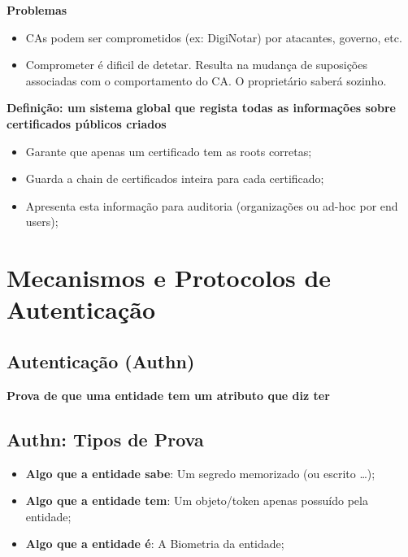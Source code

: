 \documentclass{article}
\begin{document}
\begin{flushleft}
  \textbf{Problemas}
  \begin{itemize}
    \item CAs podem ser comprometidos (ex: DigiNotar) por atacantes,
    governo, etc.
    \item Comprometer é dificil de detetar. Resulta na mudança de
    suposições associadas com o comportamento do CA.
    O proprietário saberá sozinho.
  \end{itemize}

  \vspace{2mm}

  \textbf{Definição: um sistema global que regista todas as informações sobre
  certificados públicos criados}
  \begin{itemize}
    \item Garante que apenas um certificado tem as roots corretas;
    \item Guarda a chain de certificados inteira para cada certificado;
    \item Apresenta esta informação para auditoria (organizações
    ou ad-hoc por end users);
  \end{itemize}
\end{flushleft}

\pagebreak

\section{Mecanismos e Protocolos de Autenticação}

\subsection{Autenticação (Authn)}

\textbf{Prova de que uma entidade tem um atributo que diz ter}

\subsection{Authn: Tipos de Prova}

\begin{itemize}
  \item \textbf{Algo que a entidade sabe}: Um segredo memorizado (ou escrito \dots);
  \item \textbf{Algo que a entidade tem}: Um objeto/token apenas possuído pela entidade;
  \item \textbf{Algo que a entidade é}: A Biometria da entidade;
\end{itemize}
\end{document}
